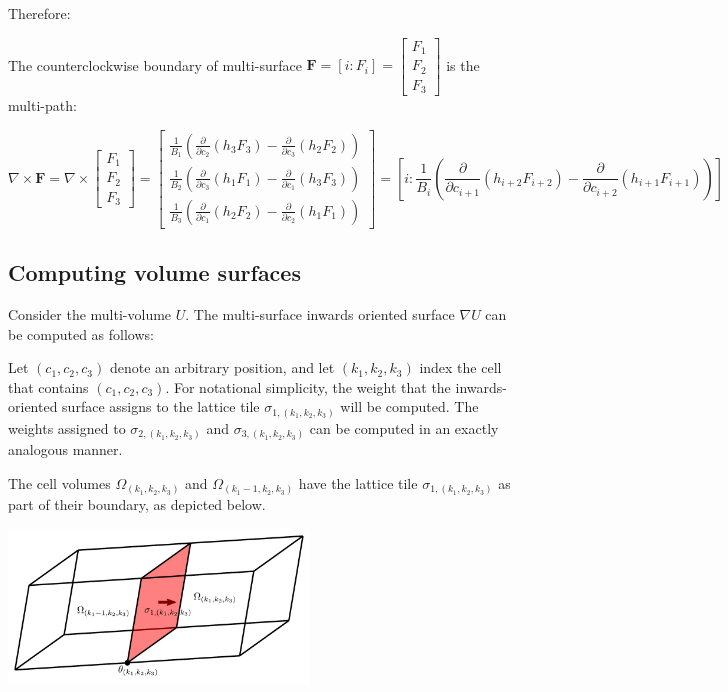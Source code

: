 Therefore:
\begin{thm}
The counterclockwise boundary of multi-surface \(\mathbf{F} = [i : F_i] = \begin{bmatrix} F_1 \\ F_2 \\ F_3 \end{bmatrix}\) is the multi-path:

\[\nabla \times \mathbf{F} = \nabla \times \begin{bmatrix} F_1 \\ F_2 \\ F_3 \end{bmatrix} = \begin{bmatrix} \frac{1}{B_1}\left(\frac{\partial}{\partial c_2}(h_3 F_3) - \frac{\partial}{\partial c_3}(h_2 F_2)\right) \\ \frac{1}{B_2}\left(\frac{\partial}{\partial c_3}(h_1 F_1) - \frac{\partial}{\partial c_1}(h_3 F_3)\right) \\ \frac{1}{B_3}\left(\frac{\partial}{\partial c_1}(h_2 F_2) - \frac{\partial}{\partial c_2}(h_1 F_1)\right) \end{bmatrix} = \left[ i : \frac{1}{B_i}\left(\frac{\partial}{\partial c_{i+1}}(h_{i+2} F_{i+2}) - \frac{\partial}{\partial c_{i+2}}(h_{i+1} F_{i+1})\right) \right]\]
\end{thm}




\subsection{Computing volume surfaces}

Consider the multi-volume \(U\). The multi-surface inwards oriented surface \(\nabla U\) can be computed as follows:

Let \((c_1, c_2, c_3)\) denote an arbitrary position, and let \((k_1, k_2, k_3)\) index the cell that contains \((c_1, c_2, c_3)\). For notational simplicity, the weight that the inwards-oriented surface assigns to the lattice tile \(\sigma_{1, (k_1, k_2, k_3)}\) will be computed. The weights assigned to \(\sigma_{2, (k_1, k_2, k_3)}\) and \(\sigma_{3, (k_1, k_2, k_3)}\) can be computed in an exactly analogous manner. 

The cell volumes \(\Omega_{(k_1, k_2, k_3)}\) and \(\Omega_{(k_1-1,k_2,k_3)}\) have the lattice tile \(\sigma_{1,(k_1,k_2,k_3)}\) as part of their boundary, as depicted below. 

\begin{center}
\includegraphics[width = 0.6\textwidth]{Coordinate_systems/volume_surface_cell}
\end{center}

